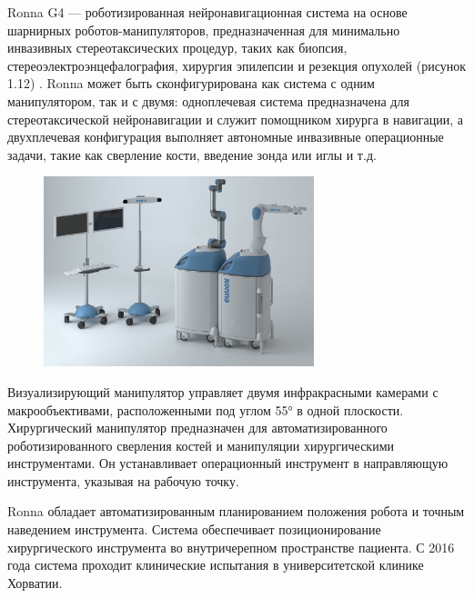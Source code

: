 Ronna G4  — роботизированная нейронавигационная система на основе шарнирных роботов-манипуляторов, предназначенная для минимально инвазивных стереотаксических процедур, таких как биопсия, стереоэлектроэнцефалография, хирургия эпилепсии и резекция опухолей (рисунок 1.12) \cite{litlink40}. Ronna может быть сконфигурирована как система с одним манипулятором, так и с двумя: одноплечевая система предназначена для стереотаксической нейронавигации и служит помощником хирурга в навигации, а двухплечевая конфигурация выполняет автономные инвазивные операционные задачи, такие как сверление кости, введение зонда или иглы и т.д. 

\begin{figure}[!h]
\begin{center}
\includegraphics[width=0.7\textwidth]{Рисунки/RONNA G4.png}
\caption{\centering {}}
\label{част}
\end{center}
\end{figure}

Визуализирующий манипулятор управляет двумя инфракрасными камерами с макрообъективами, расположенными под углом 55° в одной плоскости. Хирургический манипулятор предназначен для автоматизированного роботизированного сверления костей и манипуляции хирургическими инструментами. Он устанавливает операционный инструмент в направляющую инструмента, указывая на рабочую точку.

Ronna обладает автоматизированным планированием положения робота и точным наведением инструмента. Система обеспечивает позиционирование хирургического инструмента во внутричерепном пространстве пациента. С 2016 года система проходит клинические испытания в университетской клинике Хорватии.

